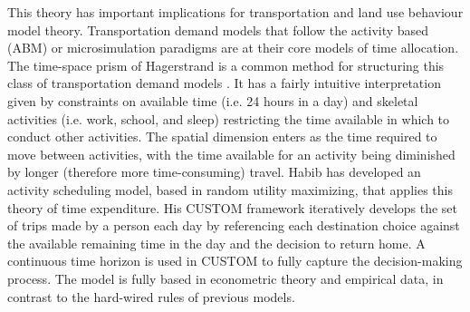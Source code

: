 
This theory has important implications for transportation and land use behaviour model theory. Transportation demand models that follow the activity based (ABM) or microsimulation paradigms are at their core models of time allocation. The time-space prism of Hagerstrand is a common method for structuring this class of transportation demand models \cite{Hagerstrand1970WhatScience}. It has a fairly intuitive interpretation given by constraints on available time (i.e. 24 hours in a day) and skeletal activities (i.e. work, school, and sleep) restricting the time available in which to conduct other activities. The spatial dimension enters as the time required to move between activities, with the time available for an activity being diminished by longer (therefore more time-consuming) travel. Habib has developed an activity scheduling model, based in random utility maximizing, that applies this theory of time expenditure. His CUSTOM framework iteratively develops the set of trips made by a person each day by referencing each destination choice against the available remaining time in the day and the decision to return home. A continuous time horizon is used in CUSTOM to fully capture the decision-making process. The model is fully based in econometric theory and empirical data, in contrast to the hard-wired rules of previous models.

